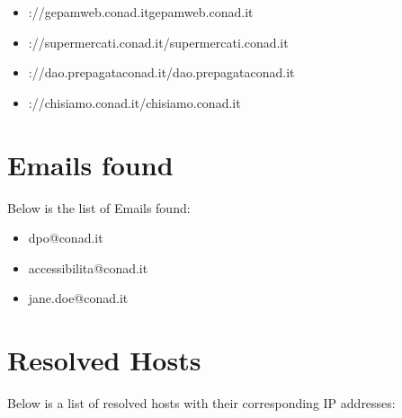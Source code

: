 \documentclass{article}
\begin{document}
\begin{itemize}
        \item \hrefhttp://gepamweb.conad.itgepamweb.conad.it
    
        
        
        \item \hrefhttp://supermercati.conad.it/supermercati.conad.it
    
        
        
        \item \hrefhttps://dao.prepagataconad.it/dao.prepagataconad.it
    
        
        
        \item \hrefhttps://chisiamo.conad.it/chisiamo.conad.it
    
\end{itemize}


\section*{Emails found}

Below is the list of Emails found:

\begin{itemize}
    
        \item dpo@conad.it
    
        \item accessibilita@conad.it
    
        \item jane.doe@conad.it
    
\end{itemize}

\section*{Resolved Hosts}

Below is a list of resolved hosts with their corresponding IP addresses:
\end{document}
